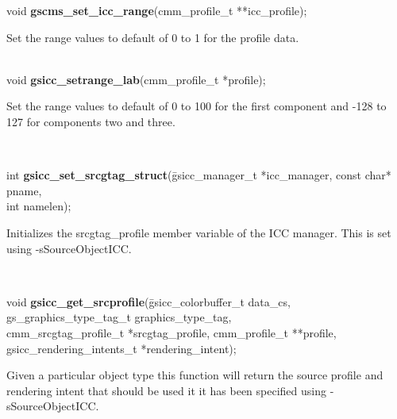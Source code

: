 \documentclass[12pt,notitlepage]{article}
\begin{document}
\noindent void {\bf gscms\_set\_icc\_range}(cmm\_profile\_t **icc\_profile);\\

\begin{minipage}[h]{6.0in}
Set the range values to default of 0 to 1 for the profile data.
\end{minipage}\\

\noindent void {\bf gsicc\_setrange\_lab}(cmm\_profile\_t *profile);\\

\begin{minipage}[h]{6.0in}
Set the range values to default of 0 to 100 for the first component and -128 to 127 for components two and three.
\end{minipage}\\


\begin{tabbing}
\noindent int {\bf gsicc\_set\_srcgtag\_struct}(\=gsicc\_manager\_t *icc\_manager, const char* pname, \\
\>int namelen);\\
\end{tabbing}

\begin{minipage}[h]{6.0in}
Initializes the srcgtag\_profile member variable of the ICC manager.  This is set using -sSourceObjectICC.
\end{minipage}\\

\begin{tabbing}
\noindent void {\bf gsicc\_get\_srcprofile}(\=gsicc\_colorbuffer\_t data\_cs,
                     gs\_graphics\_type\_tag\_t graphics\_type\_tag,\\
                     \>cmm\_srcgtag\_profile\_t *srcgtag\_profile,
                     cmm\_profile\_t **profile,\\
                     \>gsicc\_rendering\_intents\_t *rendering\_intent);\\
\end{tabbing}

\begin{minipage}[h]{6.0in}
Given a particular object type this function will return the source profile and rendering intent that should be used
it it has been specified using -sSourceObjectICC.
\end{minipage}\\

\singlespace
\end{document}
